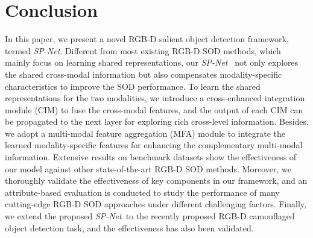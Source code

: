 \documentclass[10pt,twocolumn,letterpaper]{article}
\def\ours{\emph{SP-Net}}
\begin{document}
\section{Conclusion}

In this paper, we present a novel RGB-D salient object detection framework, termed \ours. Different from most existing RGB-D SOD methods, which mainly focus on learning shared representations, our \ours~ not only explores the shared cross-modal information but also compensates modality-specific characteristics to improve the SOD performance. To learn the shared representations for the two modalities, we introduce a cross-enhanced integration module (CIM) to fuse the cross-modal features, and the output of each CIM can be propagated to the next layer for exploring rich cross-level information. Besides, we adopt a multi-modal feature aggregation (MFA) module to integrate the learned modality-specific features for enhancing the complementary multi-modal information. Extensive results on benchmark datasets show the effectiveness of our model against other state-of-the-art RGB-D SOD methods. Moreover, we thoroughly validate the effectiveness of key components in our framework, and an attribute-based evaluation is conducted to study the performance of many cutting-edge RGB-D SOD approaches under different challenging factors. Finally, we extend the proposed \ours~to the recently proposed RGB-D camouflaged object detection task, and the effectiveness has also been validated. \\



{\small


}
\end{document}
